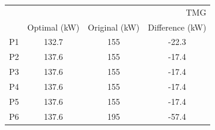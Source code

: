 \begin{table}[center]
\begin{tabular}{|c|c|c|c|}
 & \multicolumn{3}{r}{TMG} \\
 & Optimal (kW) & Original (kW) & Difference (kW) \\
P1 & 132.7 & 155 & -22.3 \\
P2 & 137.6 & 155 & -17.4 \\
P3 & 137.6 & 155 & -17.4 \\
P4 & 137.6 & 155 & -17.4 \\
P5 & 137.6 & 155 & -17.4 \\
P6 & 137.6 & 195 & -57.4 \\
\end{tabular}
\end{table}

